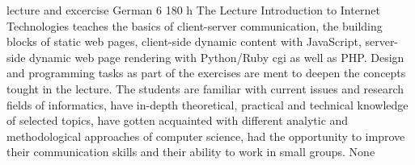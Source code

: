 {lecture and excercise}
{German}
{6}
{180 h}
{The Lecture Introduction to Internet Technologies teaches the basics of client-server communication, the building blocks of static web pages, client-side dynamic content with JavaScript, server-side dynamic web page rendering with Python/Ruby cgi as well as PHP.
Design and programming tasks as part of the exercises are ment to deepen the concepts tought in the lecture.}
{The students are familiar with current issues and research fields of informatics, have in-depth theoretical, practical and technical knowledge of selected topics, have gotten acquainted with different analytic and methodological approaches of computer science, had the opportunity to improve their communication skills and their ability to work in small groups.}
{None}